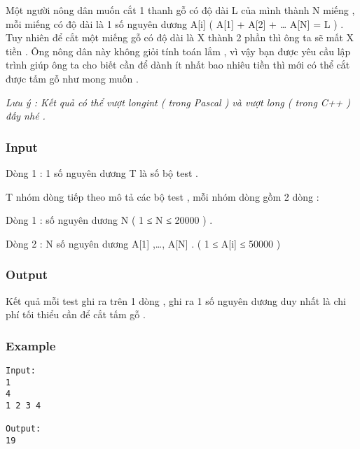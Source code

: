 



   Một người nông dân muốn cắt 1 thanh gỗ có độ dài L của mình thành N miếng , mỗi miếng có độ dài là 1 số nguyên dương A[i] ( A[1] + A[2] + … A[N] = L ) . Tuy nhiên để cắt một miếng gỗ có độ dài là X thành 2 phần thì ông ta sẽ mất X tiền . Ông nông dân này không giỏi tính toán lắm , vì vậy bạn được yêu cầu lập trình giúp ông ta cho biết cần để dành ít nhất bao nhiêu tiền thì mới có thể cắt được tấm gỗ như mong muốn .   





\textit{    Lưu ý : Kết quả có thể vượt         longint        ( trong Pascal ) và vượt         long        ( trong C++ ) đấy nhé .   }

\subsubsection{   Input  }

   Dòng 1 : 1 số nguyên dương T là số bộ test .   


   T nhóm dòng tiếp theo mô tả các bộ test , mỗi nhóm dòng gồm 2 dòng :   


   Dòng 1 : số nguyên dương N  ( 1 ≤ N ≤ 20000 )  .   


   Dòng 2 : N số nguyên dương A[1] ,…, A[N] . ( 1 ≤ A[i] ≤ 50000 )   




\subsubsection{   Output  }

   Kết quả mỗi test ghi ra trên 1 dòng , ghi ra 1 số nguyên dương duy nhất là chi phí tối thiểu cần để cắt tấm gỗ .  

\subsubsection{   Example  }
\begin{verbatim}
Input:
1
4
1 2 3 4

Output:
19
\end{verbatim}
